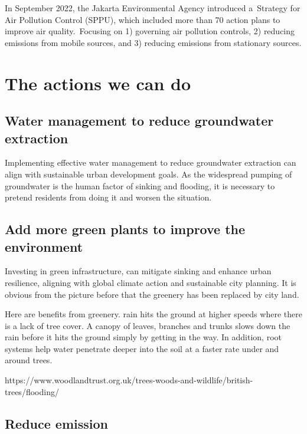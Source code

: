 \documentclass[
  letterpaper,
  DIV=11,
  numbers=noendperiod]{scrreprt}
\begin{document}
In September 2022, the Jakarta Environmental Agency introduced
a~Strategy for Air Pollution Control (SPPU), which included more than 70
action plans to improve air quality.~Focusing on 1) governing air
pollution controls, 2) reducing emissions from mobile sources, and 3)
reducing emissions from stationary sources.


\chapter{The actions we can do}\label{the-actions-we-can-do}

\section{Water management to reduce groundwater
extraction}\label{water-management-to-reduce-groundwater-extraction}

Implementing effective water management to reduce groundwater extraction
can align with sustainable urban development goals. As the widespread
pumping of groundwater is the human factor of sinking and flooding, it
is necessary to pretend residents from doing it and worsen the
situation.

\section{Add more green plants to improve the
environment}\label{add-more-green-plants-to-improve-the-environment}

Investing in green infrastructure, can mitigate sinking and enhance
urban resilience, aligning with global climate action and sustainable
city planning. It is obvious from the picture before that the greenery
has been replaced by city land.

Here are benefits from greenery. rain hits the ground at higher speeds
where there is a lack of tree cover. A canopy of leaves, branches and
trunks slows down the rain before it hits the ground simply by getting
in the way. In addition, root systems help water penetrate deeper into
the soil at a faster rate under and around trees.

https://www.woodlandtrust.org.uk/trees-woods-and-wildlife/british-trees/flooding/

\section{Reduce emission}\label{reduce-emission}
\end{document}
